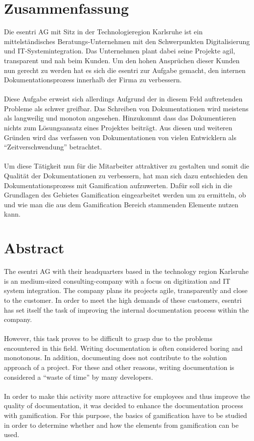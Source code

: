 \documentclass[a4paper,12pt]{scrartcl}
\begin{document}
\section*{Zusammenfassung}
Die esentri AG mit Sitz in der Technologieregion Karlsruhe ist ein mittelständisches Beratungs-Unternehmen mit den Schwerpunkten Digitalisierung und IT-Systemintegration. 
Das Unternehmen plant dabei seine Projekte agil, transparent und nah beim Kunden.
Um den hohen Ansprüchen dieser Kunden nun gerecht zu werden hat es sich die esentri zur Aufgabe gemacht, den internen Dokumentationsprozess innerhalb der Firma zu verbessern. 
\\\\
Diese Aufgabe erweist sich allerdings Aufgrund der in diesem Feld auftretenden Probleme als schwer greifbar. Das Schreiben von Dokumentationen wird meistens als langweilig und monoton angesehen. Hinzukommt dass das Dokumentieren nichts zum Lösungsansatz eines Projektes beiträgt. Aus diesen und weiteren Gründen wird das verfassen von Dokumentationen von vielen Entwicklern als “Zeitverschwendung” betrachtet. 
\\\\
Um diese Tätigkeit nun für die Mitarbeiter attraktiver zu gestalten und somit die Qualität der Dokumentationen zu verbessern, hat man sich dazu entschieden den Dokumentationsprozess mit Gamification aufzuwerten. Dafür soll sich in die Grundlagen des Gebietes Gamification eingearbeitet werden um zu ermitteln, ob und wie man die aus dem Gamification Bereich stammenden Elemente nutzen kann.


\section*{Abstract}
The esentri AG with their headquarters based in the technology region Karlsruhe is an medium-sized consulting-company with a focus on digitization and IT system integration. The company plans its projects agile, transparently and close to the customer. In order to meet the high demands of these customers, esentri has set itself the task of improving the internal documentation process within the company. 
\\\\
However, this task proves to be difficult to grasp due to the problems encountered in this field. Writing documentation is often considered boring and monotonous. In addition, documenting does not contribute to the solution approach of a project. For these and other reasons, writing documentation is considered a \enquote{waste of time} by many developers. 
\\\\
In order to make this activity more attractive for employees and thus improve the quality of documentation, it was decided to enhance the documentation process with gamification. For this purpose, the basics of gamification have to be studied in order to determine whether and how the elements from gamification can be used.     
\newpage
\thispagestyle{empty}
\tableofcontents
\thispagestyle{empty}
\newpage

\end{document}
